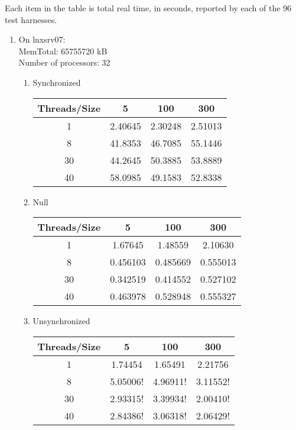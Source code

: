 \documentclass[letterpaper,twocolumn,10pt]{article}
\begin{document}
Each item in the table is total real time, in seconds, reported by each of the 96 test harnesses.
\begin{enumerate}
  \item   
  On lnxsrv07: \\
  MemTotal:       65755720 kB \\
  Number of processors: 32 \\
  \begin{enumerate}
    \item 
    Synchronized
    \begin{center}
      \begin{tabular}{|c|c|c|c|}
      \hline
        Threads/Size & 5 & 100 & 300 \\
      \hline 1 & 2.40645 & 2.30248 & 2.51013 \\
      \hline 8 & 41.8353 & 46.7085 & 55.1446 \\
      \hline 30 & 44.2645 & 50.3885 & 53.8889 \\
      \hline 40 & 58.0985 & 49.1583 & 52.8338 \\
      \hline
      \end{tabular}
    \end{center}
    \item 
    Null
    \begin{center}
      \begin{tabular}{|c|c|c|c|}
      \hline
        Threads/Size & 5 & 100 & 300 \\
      \hline 1 & 1.67645 & 1.48559 & 2.10630 \\
      \hline 8 & 0.456103 & 0.485669 & 0.555013 \\
      \hline 30 & 0.342519 & 0.414552 & 0.527102 \\
      \hline 40 & 0.463978 & 0.528948 & 0.555327 \\
      \hline
      \end{tabular}
    \end{center}
    \item 
    Unsynchronized
    \begin{center}
      \begin{tabular}{|c|c|c|c|}
      \hline
        Threads/Size & 5 & 100 & 300 \\
      \hline 1 & 1.74454 & 1.65491 & 2.21756 \\
      \hline 8 & 5.05006! & 4.96911! & 3.11552! \\
      \hline 30 & 2.93315! & 3.39934! & 2.00410! \\
      \hline 40 & 2.84386! & 3.06318! & 2.06429! \\

\end{tabular}
\end{center}
\end{enumerate}
\end{enumerate}
\end{document}
